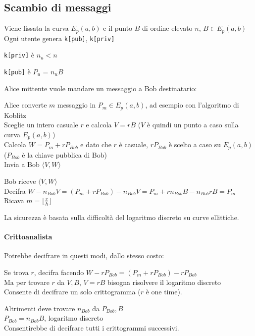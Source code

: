 \documentclass[10pt]{book}
\begin{document}
\subsection{Scambio di messaggi} Viene fissata la curva $E_p(a,b)$ e il punto $B$ di ordine elevato $n$, $B\in E_p(a,b)$\\
Ogni utente genera \texttt{k[pub]}, \texttt{k[priv]}\begin{list}{}{}
	\item \texttt{k[priv]} è $n_u < n$
	\item \texttt{k[pub]} è $P_u$ = $n_u B$
\end{list}
Alice mittente vuole mandare un messaggio a Bob destinatario:
\begin{list}{}{}
	\item Alice converte $m$ messaggio in $P_m\in E_p(a,b)$, ad esempio con l'algoritmo di Koblitz\\
	Sceglie un intero casuale $r$ e calcola $V = rB$ ($V$ è quindi un punto a caso sulla curva $E_p(a,b)$)\\
	Calcola $W = P_m + rP_{Bob}$ e dato che $r$ è casuale, $rP_{Bob}$ è scelto a caso su $E_p(a,b)$ ($P_{Bob}$ è la chiave pubblica di Bob)\\
	Invia a Bob $\langle V,W\rangle$
	\item Bob riceve $\langle V,W\rangle$\\
	Decifra $W - n_{Bob}V = (P_m + rP_{Bob}) - n_{Bob}V = P_m + rn_{Bob}B - n_{Bob}rB = P_m$\\
	Ricava $m = \lfloor \frac{x}{h}\rfloor$\\
\end{list}
La sicurezza è basata sulla difficoltà del logaritmo discreto su curve ellittiche.
\paragraph{Crittoanalista} Potrebbe decifrare in questi modi, dallo stesso costo:
\begin{list}{}{}
	\item Se trova $r$, decifra facendo $W - rP_{Bob} = (P_m +rP_{Bob}) - rP_{Bob}$\\
	Ma per trovare $r$ da $V,B$, $V = rB$ bisogna risolvere il logaritmo discreto\\
	Consente di decifrare un solo crittogramma ($r$ è one time).
	\item Altrimenti deve trovare $n_{Bob}$ da $P_{Bob},B$\\
	$P_{Bob} = n_{Bob}B$, logaritmo discreto\\
	Consentirebbe di decifrare tutti i crittogrammi successivi.
\end{list}
\end{document}
